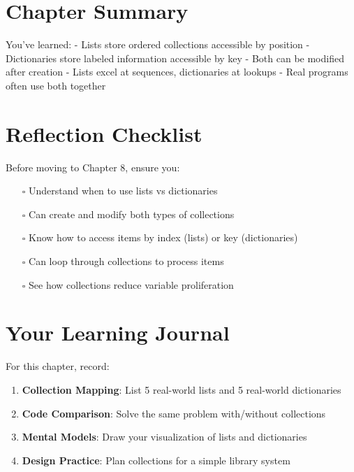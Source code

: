 \documentclass[
  letterpaper,
  DIV=11,
  numbers=noendperiod,
  oneside]{scrreprt}
\providecommand{\tightlist}{%
  \setlength{\itemsep}{0pt}\setlength{\parskip}{0pt}}\usepackage{longtable,booktabs,array}
\begin{document}
\section{Chapter Summary}\label{chapter-summary-7}

You've learned: - Lists store ordered collections accessible by position
- Dictionaries store labeled information accessible by key - Both can be
modified after creation - Lists excel at sequences, dictionaries at
lookups - Real programs often use both together

\section{Reflection Checklist}\label{reflection-checklist-6}

Before moving to Chapter 8, ensure you:

\begin{itemize}
\tightlist
\item[$\square$]
  Understand when to use lists vs dictionaries
\item[$\square$]
  Can create and modify both types of collections
\item[$\square$]
  Know how to access items by index (lists) or key (dictionaries)
\item[$\square$]
  Can loop through collections to process items
\item[$\square$]
  See how collections reduce variable proliferation
\end{itemize}

\section{Your Learning Journal}\label{your-learning-journal-7}

For this chapter, record:

\begin{enumerate}
\def\labelenumi{\arabic{enumi}.}
\tightlist
\item
  \textbf{Collection Mapping}: List 5 real-world lists and 5 real-world
  dictionaries
\item
  \textbf{Code Comparison}: Solve the same problem with/without
  collections
\item
  \textbf{Mental Models}: Draw your visualization of lists and
  dictionaries
\item
  \textbf{Design Practice}: Plan collections for a simple library system
\end{enumerate}
\end{document}
